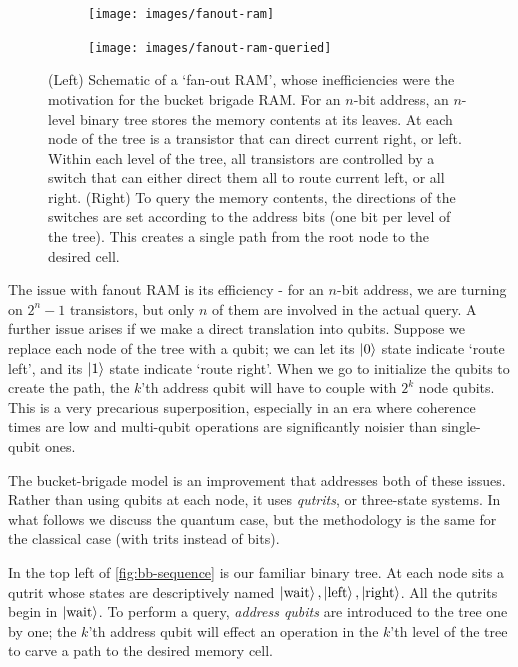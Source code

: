 \documentclass[a4paper,12pt]{article}
\begin{document}
\begin{figure}[ht!]
 \centering
  \captionsetup{width=.89\linewidth}
 \begin{subfigure}{0.45\textwidth}
    \centering
    \texttt{[image: images/fanout-ram]}
 \end{subfigure}
  \hspace{0.5cm}
  \begin{subfigure}{0.45\textwidth} 
    \centering
    \texttt{[image: images/fanout-ram-queried]}
 \end{subfigure} 
    \caption{(Left) Schematic of a `fan-out RAM', whose inefficiencies were the motivation for the bucket brigade RAM. 
    For an $n$-bit address, an $n$-level binary tree stores the memory contents at its leaves. 
    At each node of the tree is a transistor that can direct current right, or left. 
    Within each level of the tree, all transistors are controlled by a switch that can either direct them all to route current left, or all right. 
    (Right) To query the memory contents, the directions of the switches are set according to the address bits (one bit per level of the tree). 
    This creates a single path from the root node to the desired cell.}
    \label{fig:fanout-ram-sequence}
\end{figure}

The issue with fanout RAM is its efficiency - for an $n$-bit address, we are turning on $2^n - 1$ transistors, but only $n$ of them are involved in the actual query. 
A further issue arises if we make a direct translation into qubits. 
Suppose we replace each node of the tree with a qubit; we can let its $\ket{0}$ state indicate `route left', and its $\ket{1}$ state indicate `route right'. 
When we go to initialize the qubits to create the path, the $k$'th address qubit will have to couple with $2^k$ node qubits. 
This is a very precarious superposition, especially in an era where coherence times are low and multi-qubit operations are significantly noisier than single-qubit ones.


The bucket-brigade model is an improvement that addresses both of these issues.
Rather than using qubits at each node, it uses \emph{qutrits}, or three-state systems. 
In what follows we discuss the quantum case, but the methodology is the same for the classical case (with trits instead of bits).

In the top left of \autoref{fig:bb-sequence} is our familiar binary tree. 
At each node sits a qutrit whose states are descriptively named $\ket{\hbox{wait}}, \ket{\hbox{left}}, \ket{\hbox{right}}$. 
All the qutrits begin in $\ket{\hbox{wait}}$. 
To perform a query, \emph{address qubits} are introduced to the tree one by one; the $k$'th address qubit will effect an operation in the $k$'th level of the tree to carve a path to the desired memory cell.
\end{document}
